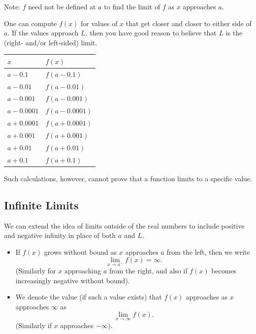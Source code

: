 \documentclass{article}
\theoremstyle{definition}
\theoremstyle{definition}
\begin{document}
\noindent Note: $f$ need not be defined at $a$ to find the limit of $f$ as $x$ approaches $a$.

\vspace{1em}

One can compute $f(x)$ for values of $x$ that get closer and closer to either side of $a$. If the values approach $L$, then you have good reason to believe that $L$ is the (right- and/or left-sided) limit.

\begin{center}
\begin{tabular}{@{}ll@{}}
\toprule[0.4mm]
   $x$        & $f(x)$        \\
\midrule
   $a-0.1$    & $f(a-0.1)$    \\
   $a-0.01$   & $f(a-0.01)$   \\
   $a-0.001$  & $f(a-0.001)$  \\
   $a-0.0001$ & $f(a-0.0001)$ \\
\midrule
   $a+0.0001$ & $f(a+0.0001)$ \\
   $a+0.001$  & $f(a+0.001)$  \\
   $a+0.01$   & $f(a+0.01)$   \\
   $a+0.1$    & $f(a+0.1)$    \\
\bottomrule[0.4mm]
\end{tabular}
\end{center}

Such calculations, however, cannot prove that a function limits to a specific value.

\subsection{Infinite Limits}

We can extend the idea of limits outside of the real numbers to include positive and negative infinity in place of both $a$ and $L$.
\begin{itemize}
\item If $f(x)$ grows without bound as $x$ approaches $a$ from the left, then we write $$\lim_{x\to a^-}f(x)=\infty.$$
(Similarly for $x$ approaching $a$ from the right, and also if $f(x)$ becomes increasingly negative without bound).
\item We denote the value (if such a value exists) that $f(x)$ approaches as $x$ approaches $\infty$ as $$\lim_{x\to\infty} f(x).$$
(Similarly if $x$ approaches $-\infty$).
\end{itemize}
\end{document}
